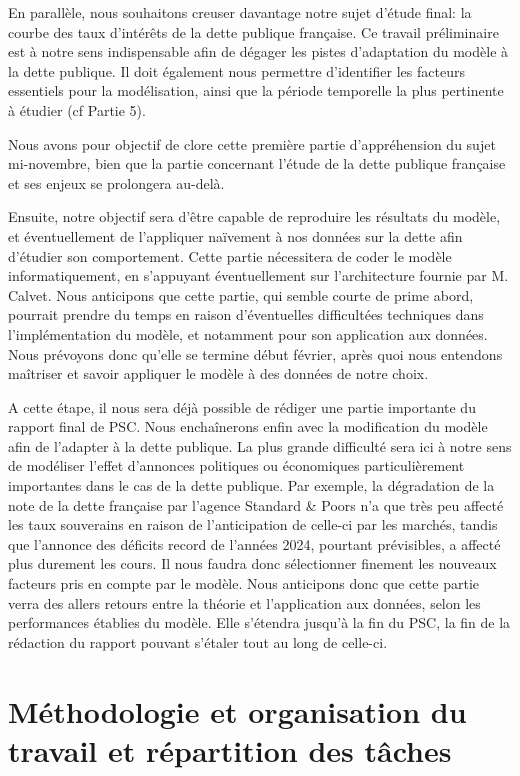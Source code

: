 \documentclass[a4paper]{article}
\begin{document}
En parallèle, nous souhaitons creuser davantage notre sujet d’étude final: la courbe des taux d’intérêts de la dette publique française. Ce travail préliminaire est à notre sens indispensable afin de dégager les pistes d’adaptation du modèle à la dette publique. Il doit également nous permettre d’identifier les facteurs essentiels pour la modélisation, ainsi que la période temporelle la plus pertinente à étudier (cf Partie 5).

Nous avons pour objectif de clore cette première partie d’appréhension du sujet mi-novembre, bien que la partie concernant l’étude de la dette publique française et ses enjeux se prolongera au-delà.

Ensuite, notre objectif sera d’être capable de reproduire les résultats du modèle, et éventuellement de l’appliquer naïvement à nos données sur la dette afin d’étudier son comportement. Cette partie nécessitera de coder le modèle informatiquement, en s’appuyant éventuellement sur l’architecture fournie par M. Calvet. Nous anticipons que cette partie, qui semble courte de prime abord, pourrait prendre du temps en raison d’éventuelles difficultées techniques dans l’implémentation du modèle, et notamment pour son application aux données. Nous prévoyons donc qu’elle se termine début février, après quoi nous entendons maîtriser et savoir appliquer le modèle à des données de notre choix.

A cette étape, il nous sera déjà possible de rédiger une partie importante du rapport final de PSC. Nous enchaînerons enfin avec la modification du modèle afin de l’adapter à la dette publique. La plus grande difficulté sera ici à notre sens de modéliser l’effet d’annonces politiques ou économiques particulièrement importantes dans le cas de la dette publique. Par exemple, la dégradation de la note de la dette française par l’agence Standard \& Poors n’a que très peu affecté les taux souverains en raison de l’anticipation de celle-ci par les marchés, tandis que l’annonce des déficits record de l’années 2024, pourtant prévisibles, a affecté plus durement les cours. Il nous faudra donc sélectionner finement les nouveaux facteurs pris en compte par le modèle. Nous anticipons donc que cette partie verra des allers retours entre la théorie et l’application aux données, selon les performances établies du modèle. Elle s’étendra jusqu’à la fin du PSC, la fin de la rédaction du rapport pouvant s’étaler tout au long de celle-ci.

\section{Méthodologie et organisation du travail et répartition des tâches}
 
\end{document}
